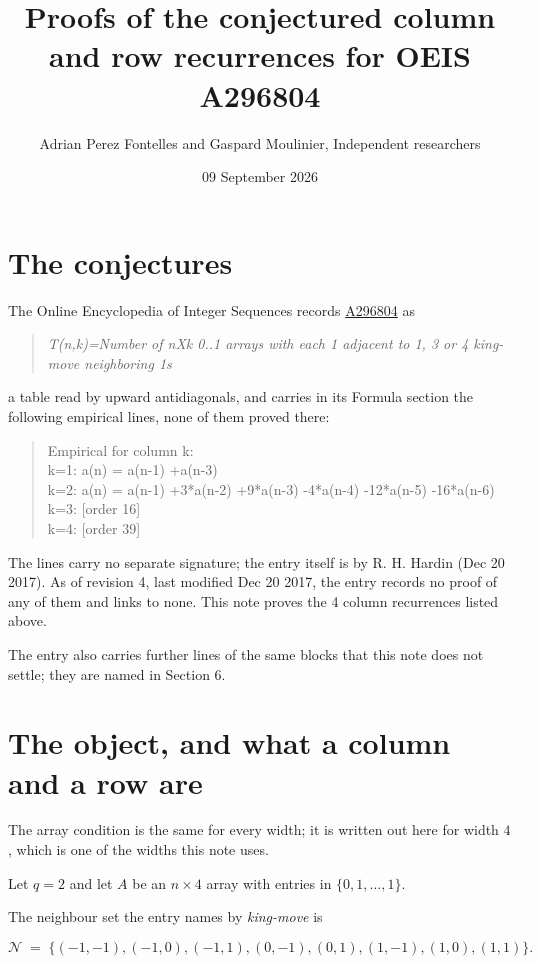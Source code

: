 \documentclass[11pt]{article}
\title{Proofs of the conjectured column and row recurrences for OEIS A296804}
\author{Adrian Perez Fontelles and Gaspard Moulinier, Independent researchers}
\date{09 September 2026}
\theoremstyle{definition}
\begin{document}
\maketitle
\section{The conjectures}

The Online Encyclopedia of Integer Sequences records \href{https://oeis.org/A296804}{A296804} as

\begin{quote}\itshape T(n,k)=Number of nXk 0..1 arrays with each 1 adjacent to 1, 3 or 4 king-move neighboring 1s\end{quote}

a table read by upward antidiagonals, and carries in its Formula section the following empirical lines, none of them proved there:

\begin{quote}\ttfamily Empirical for column k:\\
k=1: a(n) = a(n-1) +a(n-3)\\k=2: a(n) = a(n-1) +3*a(n-2) +9*a(n-3) -4*a(n-4) -12*a(n-5) -16*a(n-6)\\k=3: [order 16]\\k=4: [order 39]\end{quote}

The lines carry no separate signature; the entry itself is by R. H. Hardin (Dec 20 2017). As of revision 4, last modified Dec 20 2017, the entry records no proof of any of them and links to none. This note proves the 4 column recurrences listed above.

The entry also carries further lines of the same blocks that this note does not settle; they are named in Section 6.

\section{The object, and what a column and a row are}

The array condition is the same for every width; it is written out here for width $4$, which is one of the widths this note uses.

Let $q = 2$ and let $A$ be an $n \times 4$ array with entries in $\{0,1,\dots,1\}$.

The neighbour set the entry names by {\itshape king-move} is

\[\mathcal{N} \;=\; \{(-1,-1), (-1,0), (-1,1), (0,-1), (0,1), (1,-1), (1,0), (1,1)\}.\]
\end{document}
